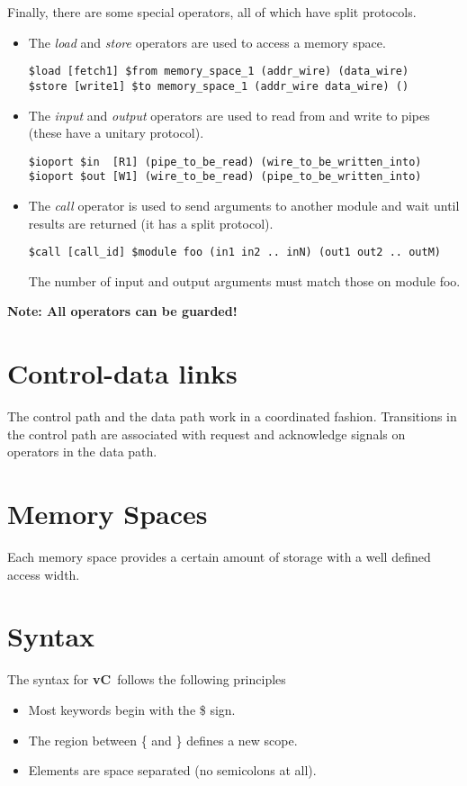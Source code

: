 \documentclass{article}
\newcommand{\vC}{{\bf vC}~}
\begin{document}
Finally, there are some special operators, all
of which have split protocols.
\begin{itemize}
\item The {\em load} and {\em store} operators are used to access
a memory space.
\begin{verbatim}
$load [fetch1] $from memory_space_1 (addr_wire) (data_wire)
$store [write1] $to memory_space_1 (addr_wire data_wire) ()
\end{verbatim}
\item The {\em input} and {\em output} operators are used
to read from and write to pipes (these have a unitary protocol).
\begin{verbatim}
$ioport $in  [R1] (pipe_to_be_read) (wire_to_be_written_into)
$ioport $out [W1] (wire_to_be_read) (pipe_to_be_written_into)
\end{verbatim}
\item The {\em call} operator is used to send arguments to
another module and wait until results are returned (it has
a split protocol).
\begin{verbatim}
$call [call_id] $module foo (in1 in2 .. inN) (out1 out2 .. outM)
\end{verbatim}
The number of input and output arguments must match those
on module foo.
\end{itemize}

{\bf Note: All operators can be guarded!}

\section{Control-data links} 

The control path and the data path work in
a coordinated fashion.  Transitions in the control
path are associated with request and acknowledge
signals on operators in the data path.  %

\section{Memory Spaces}

Each memory space provides a certain amount of 
storage with a well defined access width.  %

\section{Syntax} \label{sec:Syntax}

The syntax for \vC follows the following
principles
\begin{itemize}
\item Most keywords begin with the \$ sign.
\item The region between \{ and \} defines a new scope.
\item Elements are space separated (no semicolons at all).
\end{itemize}
\end{document}
